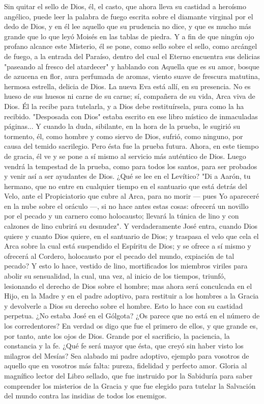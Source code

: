 \documentclass[12pt]{book} %
\begin{document}
Sin quitar el sello de Dios, él, el casto, que ahora lleva su castidad a heroísmo angélico, puede leer la palabra de fuego 
escrita sobre el diamante virginal por el dedo de Dios, y en él lee aquello que su prudencia no dice, y que es mucho más grande que lo que leyó Moisés en las tablas de piedra. Y a fin de que ningún ojo profano alcance este Misterio, él se pone, como sello sobre el sello, como arcángel de fuego, a la entrada del Paraíso, dentro del cual el Eterno encuentra sus delicias "paseando al fresco del atardecer" y hablando con Aquella que es su amor, bosque de azucena en flor, aura perfumada de aromas, viento suave de frescura matutina, hermosa estrella, delicia de Dios. La nueva Eva está allí, en su presencia. No es hueso de sus huesos ni carne de su carne; sí, compañera de su vida, Arca viva de Dios. Él la recibe para tutelarla, y a Dios debe restituírsela, pura como la ha recibido. 
"Desposada con Dios" estaba escrito en ese libro místico de inmaculadas páginas... Y cuando la duda, sibilante, en la hora de la prueba, le sugirió su tormento, él, como hombre y como siervo de Dios, sufrió, como ninguno, por causa del temido sacrilegio. Pero ésta fue la prueba futura. Ahora, en este tiempo de gracia, él ve y se pone a sí mismo al servicio más auténtico de Dios. Luego vendrá la tempestad de la prueba, como para todos los santos, para ser probados y venir así a ser ayudantes de Dios. 
¿Qué se lee en el Levítico? "Di a Aarón, tu hermano, que no entre en cualquier tiempo en el santuario que está detrás 
del Velo, ante el Propiciatorio que cubre al Arca, para no morir — pues Yo apareceré en la nube sobre el oráculo —, si no hace antes estas cosas: ofrecerá un novillo por el pecado y un carnero como holocausto; llevará la túnica de lino y con calzones de lino cubrirá su desnudez". 
Y verdaderamente José entra, cuando Dios quiere y cuanto Dios quiere, en el santuario de Dios; y traspasa el velo que 
cela el Arca sobre la cual está suspendido el Espíritu de Dios; y se ofrece a sí mismo y ofrecerá al Cordero, holocausto por el pecado del mundo, expiación de tal pecado? Y esto lo hace, vestido de lino, mortificados los miembros viriles para abolir su sensualidad, la cual, una vez, al inicio de los tiempos, triunfó, lesionando el derecho de Dios sobre el hombre; mas ahora será conculcada en el Hijo, en la Madre y en el padre adoptivo, para restituir a los hombres a la Gracia y devolverle a Dios su derecho sobre el hombre. Esto lo hace con su castidad perpetua. 
¿No estaba José en el Gólgota? ¿Os parece que no está en el número de los corredentores? En verdad os digo que fue 
el primero de ellos, y que grande es, por tanto, ante los ojos de Dios. Grande por el sacrificio, la paciencia, la constancia y la fe. ¿Qué fe será mayor que ésta, que creyó sin haber visto los milagros del Mesías? 
Sea alabado mi padre adoptivo, ejemplo para vosotros de aquello que en vosotros más falta: pureza, fidelidad y perfecto amor. Gloria  al magnífico lector del Libro sellado, que fue instruido por la Sabiduría para saber comprender los misterios de la Gracia y que fue elegido para tutelar la Salvación del mundo contra las insidias de todos los enemigos. 
 
\end{document}
